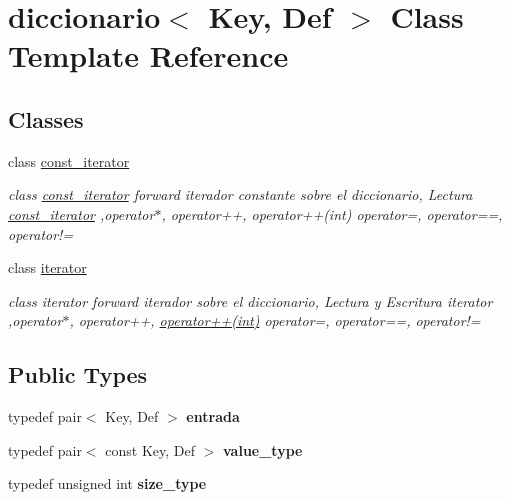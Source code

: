 \hypertarget{classdiccionario}{\section{diccionario$<$ Key, Def $>$ Class Template Reference}
\label{classdiccionario}
}
\subsection*{Classes}
\begin{DoxyCompactItemize}
\item 
class \hyperlink{classdiccionario_1_1const__iterator}{const\-\_\-iterator}
\begin{DoxyCompactList}\small\item\em class \hyperlink{classdiccionario_1_1const__iterator}{const\-\_\-iterator} forward iterador constante sobre el diccionario, Lectura \hyperlink{classdiccionario_1_1const__iterator}{const\-\_\-iterator} ,operator$\ast$, operator++, operator++(int) operator=, operator==, operator!= \end{DoxyCompactList}\item 
class \hyperlink{classdiccionario_1_1iterator}{iterator}
\begin{DoxyCompactList}\small\item\em class iterator forward iterador sobre el diccionario, Lectura y Escritura iterator ,operator$\ast$, operator++, \hyperlink{classdiccionario_1_1iterator_a64f78428635fb5d522c3fb74c620a730}{operator++(int)} operator=, operator==, operator!= \end{DoxyCompactList}\end{DoxyCompactItemize}
\subsection*{Public Types}
\begin{DoxyCompactItemize}
\item 
\hypertarget{classdiccionario_a38177da304f15a6a4c2924b96a449f7c}{typedef pair$<$ Key, Def $>$ {\bfseries entrada}}\label{classdiccionario_a38177da304f15a6a4c2924b96a449f7c}

\item 
\hypertarget{classdiccionario_a20de9fe0de835a42059ae0679e7a3ead}{typedef pair$<$ const Key, Def $>$ {\bfseries value\-\_\-type}}\label{classdiccionario_a20de9fe0de835a42059ae0679e7a3ead}

\item 
\hypertarget{classdiccionario_a5344a493b35b0764bf16aaf46d1a7e3c}{typedef unsigned int {\bfseries size\-\_\-type}}\label{classdiccionario_a5344a493b35b0764bf16aaf46d1a7e3c}

\end{DoxyCompactItemize}
